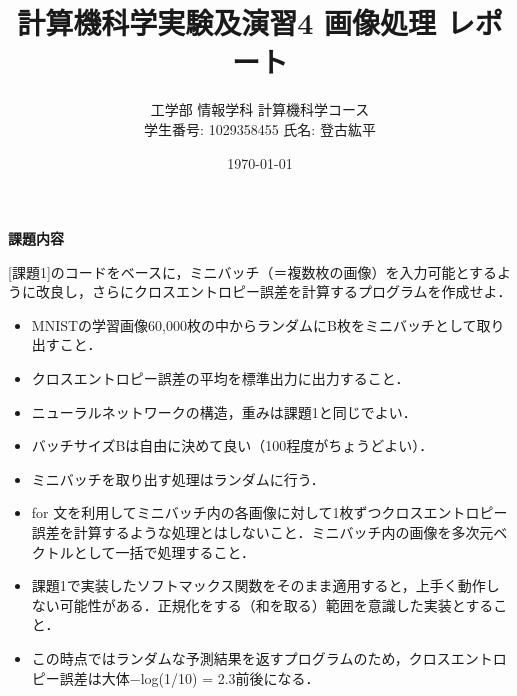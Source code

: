 \documentclass[11px,a4paper]{jsarticle}
\begin{document}
\title{計算機科学実験及演習4 画像処理 レポート}
\author{工学部 情報学科 計算機科学コース\\学生番号: 1029358455 \hspace{1em} 氏名: 登古紘平}
\date{\today}
\maketitle
\newpage

\begin{center}
\textbf{課題内容}
\end{center}
[課題1]のコードをベースに，ミニバッチ（＝複数枚の画像）を入力可能とするように改良し，さらにクロスエントロピー誤差を計算するプログラムを作成せよ．
\begin{itemize}
\item MNISTの学習画像60,000枚の中からランダムにB枚をミニバッチとして取り出すこと．
\item クロスエントロピー誤差の平均を標準出力に出力すること．
\item ニューラルネットワークの構造，重みは課題1と同じでよい．
\item バッチサイズBは自由に決めて良い（100程度がちょうどよい）．
\item ミニバッチを取り出す処理はランダムに行う．
\item for 文を利用してミニバッチ内の各画像に対して1枚ずつクロスエントロピー誤差を計算するような処理とはしないこと．ミニバッチ内の画像を多次元ベクトルとして一括で処理すること．
\item 課題1で実装したソフトマックス関数をそのまま適用すると，上手く動作しない可能性がある．正規化をする（和を取る）範囲を意識した実装とすること．
\item この時点ではランダムな予測結果を返すプログラムのため，クロスエントロピー誤差は大体−log(1/10) = 2.3前後になる．\\
\end{itemize}
\end{document}
